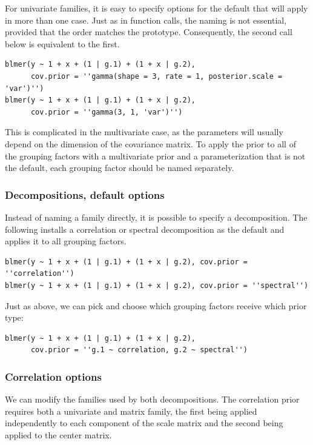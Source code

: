 \documentclass[10pt]{article}
\begin{document}
For univariate families, it is easy to specify options for the default
that will apply in more than one case. Just as in function calls, the
naming is not essential, provided that the order matches the
prototype. Consequently, the second call below is equivalent to the first.

\begin{verbatim}
blmer(y ~ 1 + x + (1 | g.1) + (1 + x | g.2),
      cov.prior = ''gamma(shape = 3, rate = 1, posterior.scale = 'var')'')
blmer(y ~ 1 + x + (1 | g.1) + (1 + x | g.2),
      cov.prior = ''gamma(3, 1, 'var')'')
\end{verbatim}

This is complicated in the multivariate case, as the parameters
will usually depend on the dimension of the covariance matrix. To
apply the prior to all of the grouping factors
with a multivariate prior and a parameterization that is not the
default, each grouping factor should be
named separately.

\subsubsection*{Decompositions, default options}

Instead of naming a family directly, it is possible to specify a
decomposition. The following installs a correlation or spectral
decomposition as the default and applies it to all grouping factors.

\begin{verbatim}
blmer(y ~ 1 + x + (1 | g.1) + (1 + x | g.2), cov.prior = ''correlation'')
blmer(y ~ 1 + x + (1 | g.1) + (1 + x | g.2), cov.prior = ''spectral'')
\end{verbatim}

Just as above, we can pick and choose which grouping factors receive
which prior type:

\begin{verbatim}
blmer(y ~ 1 + x + (1 | g.1) + (1 + x | g.2),
      cov.prior = ''g.1 ~ correlation, g.2 ~ spectral'')
\end{verbatim}

\subsubsection*{Correlation options}

We can modify the families used by both decompositions. The correlation
prior requires both a univariate and matrix family, the first being applied independently to
each component of the scale matrix and the second being applied to the center
matrix.
\end{document}
